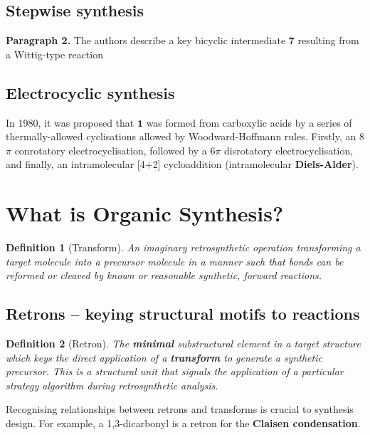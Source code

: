 \documentclass[a4paper]{tufte-handout}
\newtheorem{definition}{Definition}
\begin{document}
\subsection{Stepwise synthesis}

\textbf{Paragraph 2.} The authors describe a key bicyclic intermediate \textbf{7} resulting from a Wittig-type reaction

\subsection{Electrocyclic synthesis}

In 1980, it was proposed that $\mathbf{1}$ was formed from carboxylic acids by a series of thermally-allowed cyclisations allowed by Woodward-Hoffmann 
rules.\cite{nicolaou1982endiandricB} Firstly, an 8$\pi$ 
conrotatory electrocyclisation, followed by a 6$\pi$ disrotatory electrocyclisation, and finally, an intramolecular [4+2]
cycloaddition (intramolecular \textbf{Diels-Alder}).

\pagebreak

\section*{What is Organic Synthesis?}

\begin{definition}[Transform]
  An imaginary retrosynthetic operation transforming a target molecule into a precursor molecule in a manner 
  such that bonds can be reformed or cleaved by known or reasonable synthetic, forward reactions.
\end{definition}

\subsection*{Retrons -- keying structural motifs to reactions}

\begin{definition}[Retron]
  The \textbf{minimal} substructural element in a target structure which keys the direct application of a \textbf{transform} to generate a synthetic precursor.
  This is a structural unit that signals the application of a particular strategy algorithm during retrosynthetic analysis.
\end{definition}

Recognising relationships between retrons and transforms is crucial to synthesis design. For example, a 1,3-dicarbonyl 
is a retron for the \textbf{Claisen condensation}.
\end{document}
